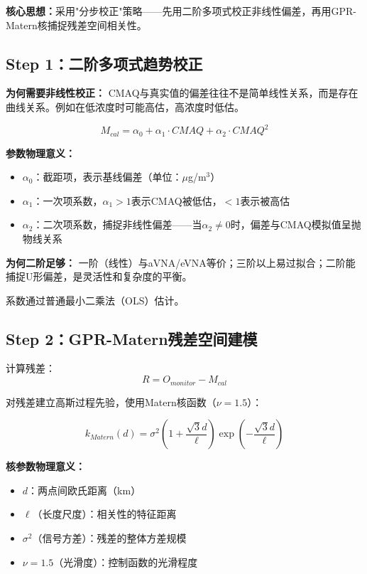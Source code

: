 \documentclass[UTF8, a4paper, 12pt]{article}
\begin{document}
\textbf{核心思想：}采用"分步校正"策略——先用二阶多项式校正非线性偏差，再用GPR-Matern核捕捉残差空间相关性。

\subsection{Step 1：二阶多项式趋势校正}

\textbf{为何需要非线性校正：} CMAQ与真实值的偏差往往不是简单线性关系，而是存在曲线关系。例如在低浓度时可能高估，高浓度时低估。

\begin{equation}
M_{cal} = \alpha_0 + \alpha_1 \cdot CMAQ + \alpha_2 \cdot CMAQ^2
\end{equation}

\textbf{参数物理意义：}
\begin{itemize}
    \item $\alpha_0$：截距项，表示基线偏差（单位：$\mu$g/m$^3$）
    \item $\alpha_1$：一次项系数，$\alpha_1 > 1$表示CMAQ被低估，$< 1$表示被高估
    \item $\alpha_2$：二次项系数，捕捉非线性偏差——当$\alpha_2 \neq 0$时，偏差与CMAQ模拟值呈抛物线关系
\end{itemize}

\textbf{为何二阶足够：} 一阶（线性）与aVNA/eVNA等价；三阶以上易过拟合；二阶能捕捉U形偏差，是灵活性和复杂度的平衡。

系数通过普通最小二乘法（OLS）估计。

\subsection{Step 2：GPR-Matern残差空间建模}

计算残差：
\begin{equation}
R = O_{monitor} - M_{cal}
\end{equation}

对残差建立高斯过程先验，使用Matern核函数（$\nu=1.5$）：

\begin{equation}
k_{Matern}(d) = \sigma^2 \left(1 + \frac{\sqrt{3}d}{\ell}\right) \exp\left(-\frac{\sqrt{3}d}{\ell}\right)
\end{equation}

\textbf{核参数物理意义：}
\begin{itemize}
    \item $d$：两点间欧氏距离（km）
    \item $\ell$（长度尺度）：相关性的特征距离
    \item $\sigma^2$（信号方差）：残差的整体方差规模
    \item $\nu=1.5$（光滑度）：控制函数的光滑程度
\end{itemize}
\end{document}
